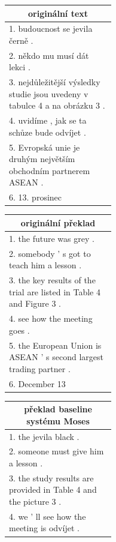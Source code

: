 \begin{figure}[H]
    \begin{center}
        \begin{tabular}{|p{0.42\linewidth}|}
          \hline
          \multicolumn{1}{|c|}{originální text} \\
          \hline
          1. budoucnost se jevila černě . \\
          2. někdo mu musí dát lekci . \\
          3. nejdůležitější výsledky studie jsou uvedeny v tabulce 4 a na obrázku 3 . \\
          4. uvidíme , jak se ta schůze bude odvíjet . \\
          5. Evropská unie je druhým největším obchodním partnerem ASEAN . \\
          6. 13. prosinec \\
          \hline
        \end{tabular}
        \hspace{10mm}
        \begin{tabular}{|p{0.42\linewidth}|}
          \hline
          \multicolumn{1}{|c|}{originální překlad} \\
          \hline
          1. the future was grey . \\
          2. somebody '  s got to teach him a lesson . \\
          3. the key results of the trial are listed in Table 4 and Figure 3 . \\
          4. see how the meeting goes . \\
          5. the European Union is ASEAN '  s second largest trading partner . \\
          6. December 13 \\
          \hline
        \end{tabular}
    \end{center}
    \begin{center}
        \begin{tabular}{|p{0.42\linewidth}|}
          \hline
          \multicolumn{1}{|c|}{překlad baseline systému Moses} \\
          \hline
          1. the jevila black .  \\
          2. someone must give him a lesson .  \\
          3. the study results are provided in Table 4 and the picture 3 . \\
          4. we ' ll see how the meeting is odvíjet . \\

\end{tabular}
\end{center}
\end{figure}
